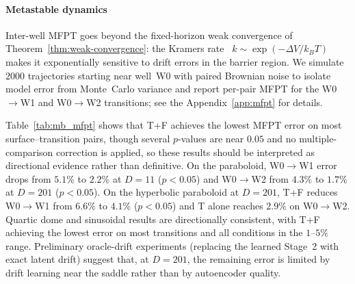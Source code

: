 \documentclass[11pt]{article}
\begin{document}
\paragraph{Metastable dynamics}
Inter-well MFPT goes beyond the fixed-horizon weak
convergence of Theorem~\ref{thm:weak-convergence}:
the Kramers rate~\cite{Kramers1940,Hanggi1990}
$k\sim\exp(-\Delta V/k_BT)$ makes it exponentially
sensitive to drift errors in the barrier region.
We simulate $2000$ trajectories starting near well~W0
with paired Brownian noise to isolate model error from
Monte~Carlo variance and report per-pair MFPT for the
W0${\to}$W1 and W0${\to}$W2 transitions; see the
Appendix~\ref{app:mfpt} for details.

Table~\ref{tab:mb_mfpt} shows that T+F achieves the
lowest MFPT error on most surface--transition pairs,
though several $p$-values are near $0.05$ and no
multiple-comparison correction is applied, so these
results should be interpreted as directional evidence
rather than definitive.
On the paraboloid, W0${\to}$W1 error drops from
$5.1\%$ to $2.2\%$ at $D{=}11$ ($p{<}0.05$) and
W0${\to}$W2 from $4.3\%$ to $1.7\%$ at $D{=}201$
($p{<}0.05$).
On the hyperbolic paraboloid at $D{=}201$, T+F
reduces W0${\to}$W1 from $6.6\%$ to $4.1\%$
($p{<}0.05$) and T alone reaches $2.9\%$ on
W0${\to}$W2.
Quartic dome and sinusoidal results are directionally
consistent, with T+F achieving the lowest error on
most transitions and all conditions in the $1$--$5\%$
range.
Preliminary oracle-drift experiments (replacing the
learned Stage~2 with exact latent drift) suggest that,
at $D{=}201$, the remaining error is limited by
drift learning near the saddle rather than by
autoencoder quality.
\end{document}
